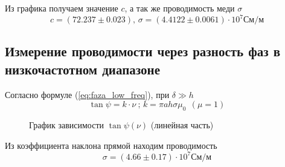 \documentclass{article}
\begin{document}
Из графика получаем значение $c$, а так же проводимость меди $\sigma$
\begin{equation}
    c=(72.237 \pm 0.023) \text{, } \sigma = (4.4122 \pm 0.0061) \cdot 10^7 См/м
\end{equation}

\newpage

\subsection{Измерение проводимости через разность фаз в низкочастотном диапазоне}
Согласно формуле (\ref{eq:faza_low_freq}), при $\delta \gg h$
\begin{equation*}
    \tan \psi = k \cdot \nu \ \text{; } k = \pi a h \sigma \mu_0 \ \ (\mu = 1)
\end{equation*}

\begin{figure}[h]
    \caption{График зависимости $\tan \psi (\nu)$ (линейная часть)}\label{fig:tg_psi_nu_line}
    \newpage
\end{figure}

\vspace{1cm}
Из коэффициента наклона прямой находим проводимость
\begin{equation}
    \sigma = (4.66 \pm 0.17) \cdot 10^7 См/м
\end{equation}

\newpage
\end{document}
